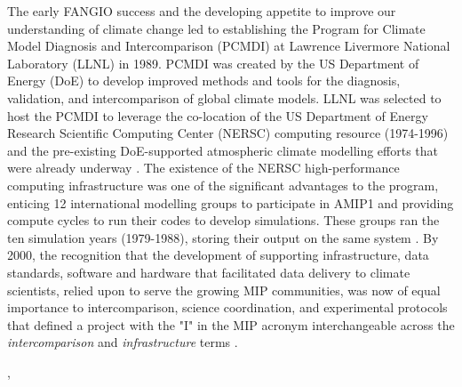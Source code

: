 \documentclass[gmd, preprint]{copernicus}
\def\cred#1{{\color{red}#1}}
\begin{document}
The early FANGIO success and the developing appetite to improve our understanding of climate change led to establishing the Program for Climate Model Diagnosis and Intercomparison (PCMDI) at Lawrence Livermore National Laboratory (LLNL) in 1989. PCMDI was created by the US Department of Energy (DoE) to develop improved methods and tools for the diagnosis, validation, and intercomparison of global climate models. LLNL was selected to host the PCMDI to leverage the co-location of the US Department of Energy Research Scientific Computing Center (NERSC) computing resource (1974-1996) and the pre-existing DoE-supported atmospheric climate modelling efforts that were already underway \citep{potter_celebrating_2011}. The existence of the NERSC high-performance computing infrastructure was one of the significant advantages to the program, enticing 12 international modelling groups to participate in AMIP1 and providing compute cycles to run their codes to develop simulations. These groups ran the ten simulation years (1979-1988), storing their output on the same system \citep{gates_amip_1991, gates_amip_1992}. By 2000, the recognition that the development of supporting infrastructure, data standards, software and hardware that facilitated data delivery to climate scientists, relied upon to serve the growing MIP communities, was now of equal importance to intercomparison, science coordination, and experimental protocols that defined a project with the "I" in the MIP acronym interchangeable across the \textit{intercomparison} and \emph{infrastructure} terms \citep{gleckler_amip_2001}.

\cred{\citet{balaji_requirements_2018}, \citet{petrie_coordinating_2021}}
\end{document}
